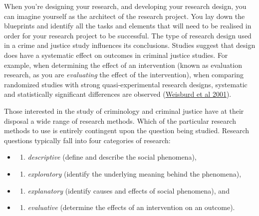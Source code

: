 \documentclass[
]{book}
\providecommand{\tightlist}{%
  \setlength{\itemsep}{0pt}\setlength{\parskip}{0pt}}
\begin{document}
When you're designing your research, and developing your research design, you can imagine yourself as the architect of the research project. You lay down the blueprints and identify all the tasks and elements that will need to be realised in order for your research project to be successful. The type of research design used in a crime and justice study influences its conclusions. Studies suggest that design does have a systematic effect on outcomes in criminal justice studies. For example, when determining the effect of an intervention (known as evaluation research, as you are \emph{evaluating} the effect of the intervention), when comparing randomized studies with strong quasi-experimental research designs, systematic and statistically significant differences are observed (\href{http://cebcp.org/wp-content/publications/Does\%20Research\%20Design\%20Affect\%20Study\%20Outcomes.pdf}{Weisburd et al 2001}).

Those interested in the study of criminology and criminal justice have at their disposal a wide range of research methods. Which of the particular research methods to use is entirely contingent upon the question being studied. Research questions typically fall into four categories of research:

\begin{itemize}
\item
  \begin{enumerate}
  \def\labelenumi{(\arabic{enumi})}
  \tightlist
  \item
    \emph{descriptive} (define and describe the social phenomena),
  \end{enumerate}
\item
  \begin{enumerate}
  \def\labelenumi{(\arabic{enumi})}
  \setcounter{enumi}{1}
  \tightlist
  \item
    \emph{exploratory} (identify the underlying meaning behind the phenomena),
  \end{enumerate}
\item
  \begin{enumerate}
  \def\labelenumi{(\arabic{enumi})}
  \setcounter{enumi}{2}
  \tightlist
  \item
    \emph{explanatory} (identify causes and effects of social phenomena), and
  \end{enumerate}
\item
  \begin{enumerate}
  \def\labelenumi{(\arabic{enumi})}
  \setcounter{enumi}{3}
  \tightlist
  \item
    \emph{evaluative} (determine the effects of an intervention on an outcome).
  \end{enumerate}
\end{itemize}
\end{document}
